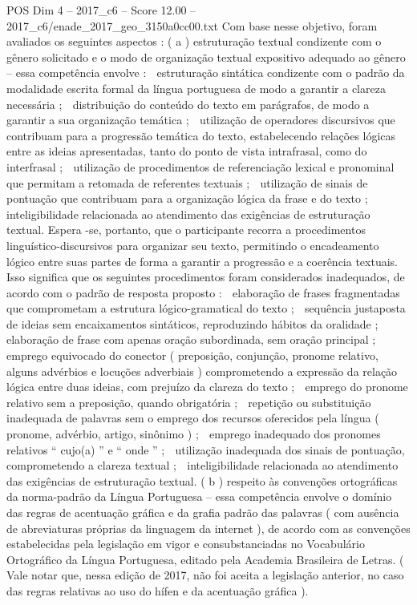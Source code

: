 \begin{textsample}{POS Dim 4 – 2017\_c6 – Score 12.00 – 2017\_c6/enade\_2017\_geo\_3150a0cc00.txt}
Com base nesse objetivo, foram avaliados os seguintes aspectos : ( a ) estruturação textual condizente com o gênero solicitado e o modo de organização textual expositivo adequado ao gênero – essa competência envolve :  estruturação sintática condizente com o padrão da modalidade escrita formal da língua portuguesa de modo a garantir a clareza necessária ;  distribuição do conteúdo do texto em parágrafos, de modo a garantir a sua organização temática ;  utilização de operadores discursivos que contribuam para a progressão temática do texto, estabelecendo relações lógicas entre as ideias apresentadas, tanto do ponto de vista intrafrasal, como do interfrasal ;  utilização de procedimentos de referenciação lexical e pronominal que permitam a retomada de referentes textuais ;  utilização de sinais de pontuação que contribuam para a organização lógica da frase e do texto ;  inteligibilidade relacionada ao atendimento das exigências de estruturação textual.
Espera -se, portanto, que o participante recorra a procedimentos linguístico-discursivos para organizar seu texto, permitindo o encadeamento lógico entre suas partes de forma a garantir a progressão e a coerência textuais.
Isso significa que os seguintes procedimentos foram considerados inadequados, de acordo com o padrão de resposta proposto :  elaboração de frases fragmentadas que comprometam a estrutura lógico-gramatical do texto ;  sequência justaposta de ideias sem encaixamentos sintáticos, reproduzindo hábitos da oralidade ;  elaboração de frase com apenas oração subordinada, sem oração principal ;  emprego equivocado do conector ( preposição, conjunção, pronome relativo, alguns advérbios e locuções adverbiais ) comprometendo a expressão da relação lógica entre duas ideias, com prejuízo da clareza do texto ;  emprego do pronome relativo sem a preposição, quando obrigatória ;  repetição ou substituição inadequada de palavras sem o emprego dos recursos oferecidos pela língua ( pronome, advérbio, artigo, sinônimo ) ;  emprego inadequado dos pronomes relativos “ cujo(a) ” e “ onde ” ;  utilização inadequada dos sinais de pontuação, comprometendo a clareza textual ;  inteligibilidade relacionada ao atendimento das exigências de estruturação textual. ( b ) respeito às convenções ortográficas da norma-padrão da Língua Portuguesa – essa competência envolve o domínio das regras de acentuação gráfica e da grafia padrão das palavras ( com ausência de abreviaturas próprias da linguagem da internet ), de acordo com as convenções estabelecidas pela legislação em vigor e consubstanciadas no Vocabulário Ortográfico da Língua Portuguesa, editado pela Academia Brasileira de Letras. ( Vale notar que, nessa edição de 2017, não foi aceita a legislação anterior, no caso das regras relativas ao uso do hífen e da acentuação gráfica ).

\end{textsample}
